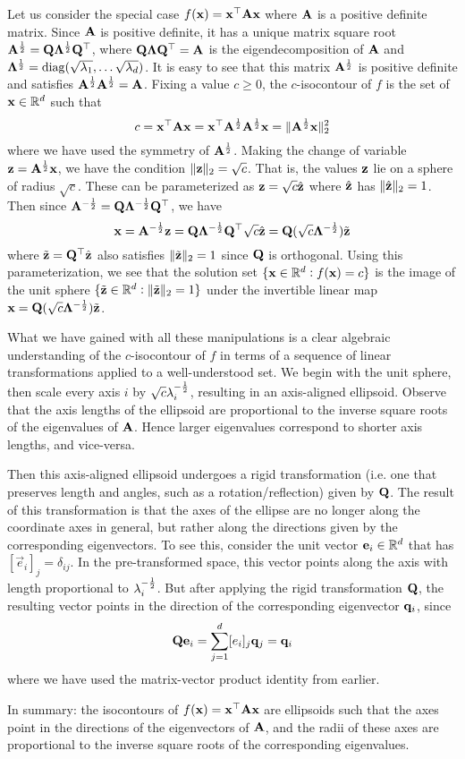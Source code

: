 Let us consider the special case $f(\mathbf{x}) = \mathbf{x}^\top\mathbf{A}\mathbf{x}$ where $\mathbf{A}$ is a positive definite matrix.
Since $\mathbf{A}$ is positive definite, it has a unique matrix square root $\mathbf{A}^{\frac{1}{2}} = \mathbf{Q}\mathbf{\Lambda}^{\frac{1}{2}}\mathbf{Q}^\top$, where $\mathbf{Q}\mathbf{\Lambda}\mathbf{Q}^\top = \mathbf{A}$ is the eigendecomposition of $\mathbf{A}$ and $\mathbf{\Lambda}^{\frac{1}{2}} = \operatorname*{diag}(\sqrt{\lambda_1}, \dots \sqrt{\lambda_d})$.
It is easy to see that this matrix $\mathbf{A}^{\frac{1}{2}}$ is positive definite and satisfies $\mathbf{A}^{\frac{1}{2}}\mathbf{A}^{\frac{1}{2}} = \mathbf{A}$.
Fixing a value $c \geq 0$, the $c$-isocontour of $f$ is the set of $\mathbf{x} \in \mathbb{R}^d$ such that
\[c = \mathbf{x}^\top\mathbf{A}\mathbf{x} = \mathbf{x}^\top\mathbf{A}^{\frac{1}{2}}\mathbf{A}^{\frac{1}{2}}\mathbf{x} = \|\mathbf{A}^{\frac{1}{2}}\mathbf{x}\|_2^2\]
where we have used the symmetry of $\mathbf{A}^{\frac{1}{2}}$.
Making the change of variable $\mathbf{z} = \mathbf{A}^{\frac{1}{2}}\mathbf{x}$, we have the condition $\|\mathbf{z}\|_2 = \sqrt{c}$.
That is, the values $\mathbf{z}$ lie on a sphere of radius $\sqrt{c}$.
These can be parameterized as $\mathbf{z} = \sqrt{c}\hat{\mathbf{z}}$ where $\hat{\mathbf{z}}$ has $\|\hat{\mathbf{z}}\|_2 = 1$.
Then since $\mathbf{A}^{-\frac{1}{2}} = \mathbf{Q}\mathbf{\Lambda}^{-\frac{1}{2}}\mathbf{Q}^\top$, we have
\[\mathbf{x} = \mathbf{A}^{-\frac{1}{2}}\mathbf{z} = \mathbf{Q}\mathbf{\Lambda}^{-\frac{1}{2}}\mathbf{Q}^\top\sqrt{c}\hat{\mathbf{z}} = \mathbf{Q}(\sqrt{c}\mathbf{\Lambda}^{-\frac{1}{2}})\tilde{\mathbf{z}}\]
where $\tilde{\mathbf{z}} = \mathbf{Q}^\top\hat{\mathbf{z}}$ also satisfies $\|\tilde{\mathbf{z}}\|_2 = 1$ since $\mathbf{Q}$ is orthogonal.
Using this parameterization, we see that the solution set $\{\mathbf{x} \in \mathbb{R}^d : f(\mathbf{x}) = c\}$ is the image of the unit sphere $\{\tilde{\mathbf{z}} \in \mathbb{R}^d : \|\tilde{\mathbf{z}}\|_2 = 1\}$ under the invertible linear map $\mathbf{x} = \mathbf{Q}(\sqrt{c}\mathbf{\Lambda}^{-\frac{1}{2}})\tilde{\mathbf{z}}$.

What we have gained with all these manipulations is a clear algebraic understanding of the $c$-isocontour of $f$ in terms of a sequence of linear transformations applied to a well-understood set.
We begin with the unit sphere, then scale every axis $i$ by $\sqrt{c}\lambda_i^{-\frac{1}{2}}$, resulting in an axis-aligned ellipsoid.
Observe that the axis lengths of the ellipsoid are proportional to the inverse square roots of the eigenvalues of $\mathbf{A}$.
Hence larger eigenvalues correspond to shorter axis lengths, and vice-versa.

Then this axis-aligned ellipsoid undergoes a rigid transformation (i.e. one that preserves length and angles, such as a rotation/reflection) given by $\mathbf{Q}$.
The result of this transformation is that the axes of the ellipse are no longer along the coordinate axes in general, but rather along the directions given by the corresponding eigenvectors.
To see this, consider the unit vector $\mathbf{e}_i \in \mathbb{R}^d$ that has $[\vec{e}_i]_j = \delta_{ij}$.
In the pre-transformed space, this vector points along the axis with length proportional to $\lambda_i^{-\frac{1}{2}}$.
But after applying the rigid transformation $\mathbf{Q}$, the resulting vector points in the direction of the corresponding eigenvector $\mathbf{q}_i$, since
\[\mathbf{Q}\mathbf{e}_i = \sum_{j=1}^d [e_i]_j\mathbf{q}_j = \mathbf{q}_i\]
where we have used the matrix-vector product identity from earlier.

In summary: the isocontours of $f(\mathbf{x}) = \mathbf{x}^\top\mathbf{A}\mathbf{x}$ are ellipsoids such that the axes point in the directions of the eigenvectors of $\mathbf{A}$, and the radii of these axes are proportional to the inverse square roots of the corresponding eigenvalues.
